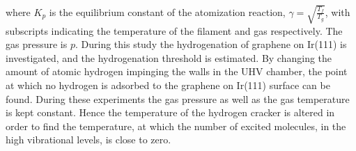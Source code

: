 where $K_p$ is the equilibrium constant of the atomization reaction, $\gamma = \sqrt{\frac{T_f}{T_g}}$, with subscripts indicating the temperature of the filament and gas respectively. The gas pressure is $p$. During this study the hydrogenation of graphene on Ir(111) is investigated, and the hydrogenation threshold is estimated. By changing the amount of atomic hydrogen impinging the walls in the UHV chamber, the point at which no hydrogen is adsorbed to the graphene on Ir(111) surface can be found. During these experiments the gas pressure as well as the gas temperature is kept constant. Hence the temperature of the hydrogen cracker is altered in order to find the temperature, at which the number of excited molecules, in the high vibrational levels, is close to zero.

